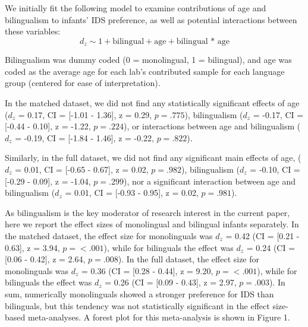 \documentclass[,man,floatsintext]{apa6}
\begin{document}
We initially fit the following model to examine contributions of age and bilingualism to infants' IDS preference, as well as potential interactions between these variables: \[d_z \sim 1 + \text{bilingual} + \text{age} + \text{bilingual * age}\]

Bilingualism was dummy coded (0 = monolingual, 1 = bilingual), and age was coded as the average age for each lab's contributed sample for each language group (centered for ease of interpretation).

In the matched dataset, we did not find any statistically significant effects of age (\(d_z\) = 0.17, CI = {[}-1.01 - 1.36{]}, z = 0.29, \(p = .775\)), bilingualism (\(d_z\) =
-0.17, CI = {[}-0.44 - 0.10{]}, z = -1.22, \(p = .224\)), or interactions between age and bilingualism (\(d_z\) = -0.19, CI = {[}-1.84 - 1.46{]}, z = -0.22, \(p = .822\)).

Similarly, in the full dataset, we did not find any significant main effects of age, (\(d_z\) = 0.01, CI = {[}-0.65 - 0.67{]}, z = 0.02, \(p = .982\)),
bilingualism (\(d_z\) = -0.10, CI = {[}-0.29 - 0.09{]}, z = -1.04, \(p = .299\)), nor a significant interaction between age and bilingualism (\(d_z\) = 0.01, CI = {[}-0.93 - 0.95{]}, z = 0.02, \(p = .981\)).

As bilingualism is the key moderator of research interest in the current paper, here we report the effect sizes of monolingual and bilingual infants separately. In the matched dataset, the effect size for monolinguals was \(d_z\) = 0.42 (CI = {[}0.21 - 0.63{]}, z = 3.94, \(p = < .001\)), while for bilinguals the effect was \(d_z\) = 0.24 (CI = {[}0.06 - 0.42{]}, z = 2.64, \(p = .008\)). In the full dataset, the effect size for monolinguals was \(d_z\) = 0.36 (CI = {[}0.28 - 0.44{]}, z = 9.20, \(p = < .001\)), while for bilinguals the effect was \(d_z\) = 0.26 (CI = {[}0.09 - 0.43{]}, z = 2.97, \(p = .003\)). In sum, numerically monolinguals showed a stronger preference for IDS than bilinguals, but this tendency was not statistically significant in the effect size-based meta-analyses. A forest plot for this meta-analysis is shown in Figure 1.
\end{document}
